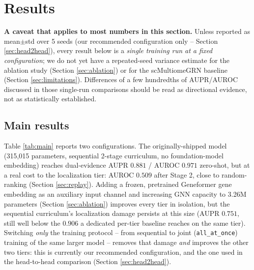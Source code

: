 \documentclass{article}
\theoremstyle{plain}
\theoremstyle{definition}
\begin{document}
\section{Results}
\label{sec:results}

\textbf{A caveat that applies to most numbers in this section.} Unless
reported as mean$\pm$std over 5 seeds (our recommended configuration
only -- Section \ref{sec:head2head}), every result below is a
\emph{single training run at a fixed configuration}; we do not yet have a
repeated-seed variance estimate for the ablation study (Section
\ref{sec:ablation}) or for the scMultiomeGRN baseline (Section
\ref{sec:limitations}). Differences of a few hundredths of AUPR/AUROC
discussed in those single-run comparisons should be read as directional
evidence, not as statistically established.

\subsection{Main results}
Table \ref{tab:main} reports two configurations. The originally-shipped
model (315{,}015 parameters, sequential 2-stage curriculum, no
foundation-model embedding) reaches dual-evidence AUPR $0.881$ / AUROC
$0.971$ zero-shot, but at a real cost to the localization tier: AUROC
$0.509$ after Stage 2, close to random-ranking (Section \ref{sec:replay}).
Adding a frozen, pretrained Geneformer \cite{theodoris2023geneformer} gene
embedding as an auxiliary input channel and increasing GNN capacity to
3.26M parameters (Section \ref{sec:ablation}) improves every tier in
isolation, but the sequential curriculum's localization damage persists at
this size (AUPR $0.751$, still well below the $0.906$ a dedicated
per-tier baseline reaches on the same tier). Switching \emph{only} the
training protocol -- from sequential to joint (\texttt{all\_at\_once})
training of the same larger model -- removes that damage \emph{and}
improves the other two tiers: this is currently our recommended
configuration, and the one used in the head-to-head comparison
(Section \ref{sec:head2head}).
\end{document}

